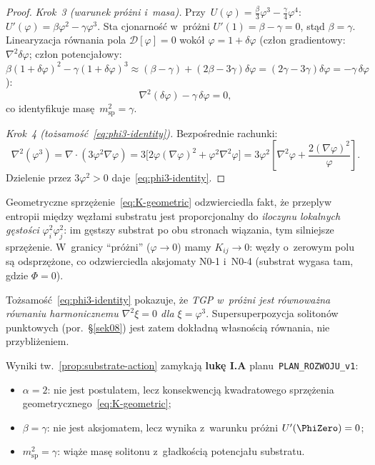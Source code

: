 \begin{proof}
\emph{Krok~3 (warunek pr\'o\.zni i~masa).}
Przy~$U(\varphi) = \tfrac{\beta}{3}\varphi^3 - \tfrac{\gamma}{4}\varphi^4$:
$U'(\varphi) = \beta\varphi^2 - \gamma\varphi^3$.
Sta cjonarno\'s\'c w~pr\'o\.zni $U'(1) = \beta - \gamma = 0$,
st\k{a}d $\beta = \gamma$.
Linearyzacja r\'ownania pola $\mathcal{D}[\varphi] = 0$
wok\'o\l{} $\varphi = 1 + \delta\varphi$
(cz\l{}on gradientowy: $\nabla^2\delta\varphi$;
cz\l{}on potencja\l{}owy:
$\beta(1{+}\delta\varphi)^2 - \gamma(1{+}\delta\varphi)^3
\approx (\beta-\gamma) + (2\beta-3\gamma)\delta\varphi
= (2\gamma-3\gamma)\delta\varphi = -\gamma\,\delta\varphi$):
\begin{equation}
  \nabla^2(\delta\varphi) - \gamma\,\delta\varphi = 0,
\end{equation}
co identyfikuje mas\k{e}~$m_{\mathrm{sp}}^2 = \gamma$.

\emph{Krok~4 (to\.zsamo\'s\'c~\eqref{eq:phi3-identity}).}
Bezpo\'srednie rachunki:
\begin{equation}
  \nabla^2(\varphi^3)
  = \nabla\cdot(3\varphi^2\nabla\varphi)
  = 3\bigl[2\varphi(\nabla\varphi)^2 + \varphi^2\nabla^2\varphi\bigr]
  = 3\varphi^2\!\left[\nabla^2\varphi
    + \frac{2(\nabla\varphi)^2}{\varphi}\right].
\end{equation}
Dzielenie przez $3\varphi^2 > 0$ daje~\eqref{eq:phi3-identity}.
\end{proof}

\begin{remark}%
\label{rem:substrate-action-physics}
Geometryczne sprz\k{e}\.zenie~\eqref{eq:K-geometric} odzwierciedla
fakt, \.ze przepl{}yw entropii mi\k{e}dzy w\k{e}z\l{}ami substratu
jest proporcjonalny do \emph{iloczynu lokalnych g\k{e}sto\'sci}
$\varphi_i^2\varphi_j^2$: im g\k{e}stszy substrat po obu
stronach wi\k{a}zania, tym silniejsze sprz\k{e}\.zenie.
W~granicy ``pr\'o\.zni'' ($\varphi \to 0$) mamy $K_{ij} \to 0$:
w\k{e}z\l{}y o~zerowym polu s\k{a} odsprz\k{e}\.zone, co odzwierciedla
aksjomaty N0-1 i~N0-4 (substrat wygasa tam, gdzie $\Phi = 0$).

To\.zsamo\'s\'c~\eqref{eq:phi3-identity} pokazuje, \.ze
\emph{TGP w~pr\'o\.zni jest r\'ownowa\.zna r\'ownaniu harmonicznemu
$\nabla^2\xi = 0$ dla $\xi = \varphi^3$}.
Supersuperpozycja soliton\'ow punktowych
(por.\ \S\ref{sek08}) jest zatem dok\l{}adn\k{a} w\l{}asno\'sci\k{a}
r\'ownania, nie przybli\.zeniem.

Wyniki tw.~\ref{prop:substrate-action} zamykaj\k{a}
\textbf{luk\k{e} I.A} planu~\texttt{PLAN\_ROZWOJU\_v1}:
\begin{itemize}[nosep]
  \item $\alpha = 2$: nie jest postulatem, lecz konsekwencj\k{a}
    kwadratowego sprz\k{e}\.zenia geometrycznego~\eqref{eq:K-geometric};
  \item $\beta = \gamma$: nie jest aksjomatem, lecz wynika
    z~warunku pr\'o\.zni $U'(\PhiZero) = 0$;
  \item $m_{\mathrm{sp}}^2 = \gamma$: wi\k{a}\.ze mas\k{e} solitonu
    z~g\l{}adko\'sci\k{a} potencja\l{}u substratu.
\end{itemize}
\end{remark}
